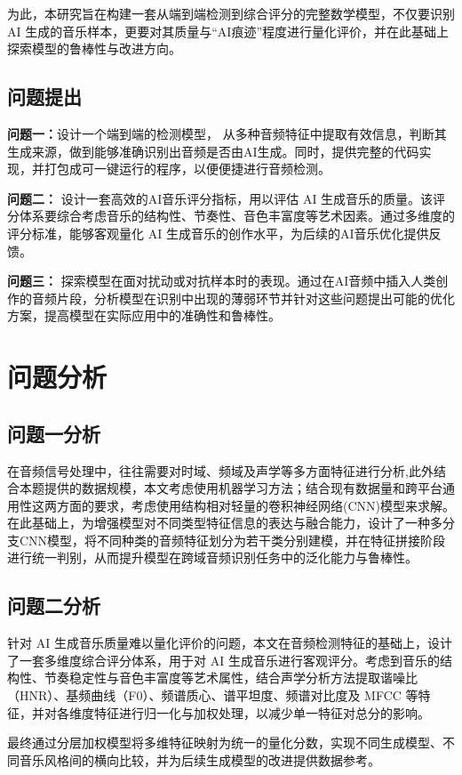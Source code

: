 \documentclass[a4paper,12pt]{article}
\begin{document}
为此，本研究旨在构建一套从端到端检测到综合评分的完整数学模型，不仅要识别 AI 生成的音乐样本，更要对其质量与“AI痕迹”程度进行量化评价，并在此基础上探索模型的鲁棒性与改进方向。

\subsection{问题提出}
\textbf{问题一：}设计一个端到端的检测模型，
从多种音频特征中提取有效信息，判断其生成来源，做到能够准确识别出音频是否由AI生成。同时，提供完整的代码实现，并打包成可一键运行的程序，以便便捷进行音频检测。

\textbf{问题二：}
设计一套高效的AI音乐评分指标，用以评估 AI 生成音乐的质量。该评分体系要综合考虑音乐的结构性、节奏性、音色丰富度等艺术因素。通过多维度的评分标准，能够客观量化 AI 生成音乐的创作水平，为后续的AI音乐优化提供反馈。

\textbf{问题三：}
探索模型在面对扰动或对抗样本时的表现。通过在AI音频中插入人类创作的音频片段，分析模型在识别中出现的薄弱环节并针对这些问题提出可能的优化方案，提高模型在实际应用中的准确性和鲁棒性。

\section{问题分析}
\subsection{问题一分析}
 在音频信号处理中，往往需要对时域、频域及声学等多方面特征进行分析,此外结合本题提供的数据规模，本文考虑使用机器学习方法；结合现有数据量和跨平台通用性这两方面的要求，考虑使用结构相对轻量的卷积神经网络(CNN)模型来求解。在此基础上，为增强模型对不同类型特征信息的表达与融合能力，设计了一种多分支CNN模型，将不同种类的音频特征划分为若干类分别建模，并在特征拼接阶段进行统一判别，从而提升模型在跨域音频识别任务中的泛化能力与鲁棒性。

\subsection{问题二分析}

针对 AI 生成音乐质量难以量化评价的问题，本文在音频检测特征的基础上，设计了一套多维度综合评分体系，用于对 AI 生成音乐进行客观评分。考虑到音乐的结构性、节奏稳定性与音色丰富度等艺术属性，结合声学分析方法提取谐噪比（HNR）、基频曲线（F0）、频谱质心、谱平坦度、频谱对比度及 MFCC 等特征，并对各维度特征进行归一化与加权处理，以减少单一特征对总分的影响。

最终通过分层加权模型将多维特征映射为统一的量化分数，实现不同生成模型、不同音乐风格间的横向比较，并为后续生成模型的改进提供数据参考。
\end{document}
